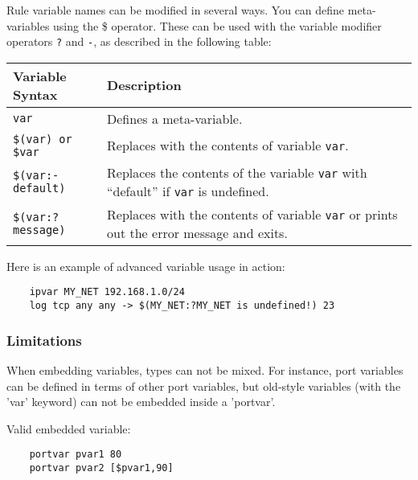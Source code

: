 \documentclass[english]{report}
\begin{document}
Rule variable names can be modified in several ways. You can define
meta-variables using the \$ operator. These can be used with the variable
modifier operators {\tt ?}  and {\tt -}, as described in the following table: 

\begin{center}
\begin{tabular}{| l | p{4.5in} |}

\hline
\textbf{Variable Syntax} & \textbf{Description}\\
\hline

\hline
\texttt{var} &

Defines a meta-variable.\\

\hline
\texttt{\$(var) or \$var} &

Replaces with the contents of variable \texttt{var}.\\

\hline
\texttt{\$(var:-default)} &

Replaces the contents of the variable \texttt{var} with ``default'' if
\texttt{var} is undefined.\\

\hline
\texttt{\$(var:?message)} &

Replaces with the contents of variable \texttt{var} or prints out the error
message and exits.\\

\hline
\end{tabular}
\end{center}

Here is an example of advanced variable usage in action:

\begin{verbatim}
    ipvar MY_NET 192.168.1.0/24
    log tcp any any -> $(MY_NET:?MY_NET is undefined!) 23
\end{verbatim}

\subsubsection{Limitations}

When embedding variables, types can not be mixed.  For instance, port variables
can be defined in terms of other port variables, but old-style variables (with
the 'var' keyword) can not be embedded inside a 'portvar'.

Valid embedded variable:

\begin{verbatim}
    portvar pvar1 80
    portvar pvar2 [$pvar1,90]
\end{verbatim}
\end{document}
